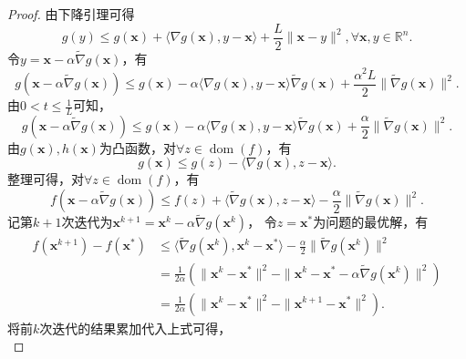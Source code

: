 \begin{proof}
    由下降引理可得
    \begin{equation*}
        g(y) \leq g(\bm{x}) + \langle \nabla g(\bm{x}), y-\bm{x} \rangle + \frac{L}{2}\|\bm{x}-y\|^{2}, \forall \bm{x}, y \in \mathbb{R}^{n}.
    \end{equation*}
    令$y=\bm{x}-\alpha\tilde{\nabla} g(\bm{x})$，有
    \begin{equation*}
        g(\bm{x}-\alpha\tilde{\nabla} g(\bm{x})) \leq g(\bm{x}) - \alpha \langle \nabla g(\bm{x}), y-\bm{x} \rangle \tilde{\nabla} g(\bm{x}) + \frac{\alpha^{2}L}{2}\|\tilde{\nabla} g(\bm{x})\|^{2}.
    \end{equation*}
    由$0<t\leq \frac{1}{L}$可知，
    \begin{equation*}
        g(\bm{x}-\alpha\tilde{\nabla} g(\bm{x})) \leq g(\bm{x}) - \alpha \langle \nabla g(\bm{x}), y-\bm{x} \rangle \tilde{\nabla} g(\bm{x}) + \frac{\alpha}{2}\|\tilde{\nabla} g(\bm{x})\|^{2}.
    \end{equation*}
    由$g(\bm{x}), h(\bm{x})$为凸函数，对$\forall z \in \mathop{\mathrm{dom}} (f)$，有
    \begin{equation*}
        g(\bm{x}) \leq g(z) - \langle \nabla g(\bm{x}), z-\bm{x}  \rangle.
    \end{equation*}
    整理可得，对$\forall z \in \mathop{\mathrm{dom}} (f)$，有
    \begin{equation*}
        f(\bm{x}-\alpha\tilde{\nabla} g(\bm{x})) \leq f(z) + \langle \tilde{\nabla}g(\bm{x}), z-\bm{x} \rangle - \frac{\alpha}{2}\|\tilde{\nabla} g(\bm{x})\|^{2}.
    \end{equation*}
    记第$k+1$次迭代为$\bm{x}^{k+1}=\bm{x}^{k}-\alpha\tilde{\nabla}g(\bm{x}^{k})$，
    令$z=\bm{x}^{*}$为问题的最优解，有
    \begin{equation}
        \begin{split}
            f(\bm{x}^{k+1})-f(\bm{x}^{*}) &\leq \langle \tilde{\nabla}g(\bm{x}^{k}), \bm{x}^{k}-\bm{x}^{*} \rangle - \frac{\alpha}{2}\|\tilde{\nabla}g(\bm{x}^{k})\|^{2} \\
            &=\frac{1}{2\alpha}(\|\bm{x}^{k}-\bm{x}^{*}\|^{2} - \|\bm{x}^{k}-\bm{x}^{*}-\alpha\tilde{\nabla}g(\bm{x}^{k})\|^{2}) \\
            &=\frac{1}{2\alpha}(\|\bm{x}^{k}-\bm{x}^{*}\|^{2} - \|\bm{x}^{k+1}-\bm{x}^{*}\|^{2}).
        \end{split}
        \nonumber
    \end{equation}
    将前$k$次迭代的结果累加代入上式可得，
    \begin{equation}

\end{equation}
\end{proof}
